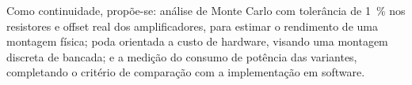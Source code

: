 Como continuidade, propõe-se: análise de Monte Carlo com tolerância de
\SI{1}{\percent} nos resistores e offset real dos amplificadores, para
estimar o rendimento de uma montagem física; poda orientada a custo de
hardware, visando uma montagem discreta de bancada; e a medição do
consumo de potência das variantes, completando o critério de
comparação com a implementação em software.
